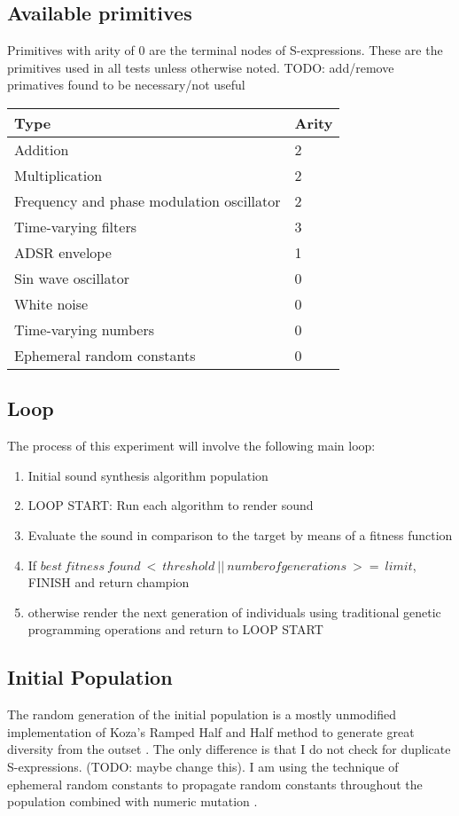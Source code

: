 \documentclass[12pt]{article}
\begin{document}
\subsection{Available primitives}
Primitives with arity of $0$ are the terminal nodes of S-expressions. These are the primitives used in all tests unless otherwise noted. TODO: add/remove primatives found to be necessary/not useful
\begin{center}
\begin{tabular}{ | l | l | } \hline
Type & Arity \\ \hline
Addition & 2 \\ \hline
Multiplication & 2 \\ \hline
Frequency and phase modulation oscillator & 2 \\ \hline
Time-varying filters & 3 \\ \hline
ADSR envelope & 1 \\ \hline
Sin wave oscillator & 0 \\ \hline
White noise & 0 \\ \hline
Time-varying numbers & 0 \\ \hline
Ephemeral random constants & 0 \\ \hline
\end{tabular}
\end{center}
\subsection{Loop}
The process of this experiment will involve the following main loop:
\begin{enumerate}
\item
Initial sound synthesis algorithm population
\item
LOOP START:
Run each algorithm to render sound
\item
Evaluate the sound in comparison to the target by means of a fitness function
\item
If $best\ fitness\ found\ <\ threshold\ ||\ number of generations\ >=\ limit$, FINISH and return champion
\item
otherwise render the next generation of individuals using traditional genetic programming operations and return to LOOP START
\end{enumerate}
\subsection{Initial Population}
The random generation of the initial population is a mostly unmodified implementation of Koza's Ramped Half and Half method to generate great diversity from the outset \citep{koza1992genetic}. The only difference is that I do not check for duplicate S-expressions. (TODO: maybe change this). I am using the technique of ephemeral random constants to propagate random constants throughout the population combined with numeric mutation \citep{evett1998numeric}.
\end{document}
